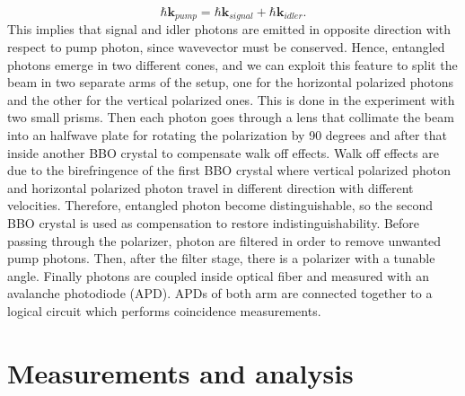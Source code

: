 \documentclass[a4paper,10pt]{article}
\renewcommand{\k}{\mathbf{k}}
\begin{document}
\begin{equation}\hbar \k_{pump} = \hbar \k_{signal} + \hbar\k_{idler}.\end{equation}
This implies that signal and idler photons are emitted in opposite direction with respect to pump photon, since wavevector must be conserved. Hence, entangled photons emerge in two different cones, and we can exploit this feature to split the beam in two separate arms of the setup, one for the horizontal polarized photons and the other for the vertical polarized ones. This is done in the experiment with two small prisms. Then each photon goes through a lens that collimate the beam into an halfwave plate for rotating the polarization by 90 degrees and after that inside another BBO crystal to compensate walk off effects. Walk off effects are due to the birefringence of the first BBO crystal where vertical polarized photon and horizontal polarized photon travel in different direction with different velocities. Therefore, entangled photon become distinguishable, so the second BBO crystal is used as compensation to restore indistinguishability. Before passing through the polarizer, photon are filtered in order to remove unwanted pump photons. Then, after the filter stage, there is a polarizer with a tunable angle. Finally photons are coupled inside optical fiber and measured with an avalanche photodiode (APD). APDs of both arm are connected together to a logical circuit which performs coincidence measurements. 

\section{Measurements and analysis}
\end{document}
